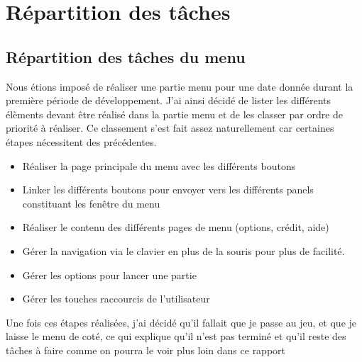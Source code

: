 \documentclass[12pt, openany]{report}
\begin{document}
  \chapter{Répartition des tâches}
    \section{Répartition des tâches du menu}
    Nous étions imposé de réaliser une partie menu pour une date donnée durant la première période de développement. J'ai ainsi décidé de lister les différents élèments devant être réalisé dans la partie menu et de les classer par ordre de priorité à réaliser. Ce classement s'est fait assez naturellement car certaines étapes nécessitent des précédentes.
    \begin{itemize}
      \item Réaliser la page principale du menu avec les différents boutons
      \item Linker les différents boutons pour envoyer vers les différents panels constituant les fenêtre du menu
      \item Réaliser le contenu des différents pages de menu (options, crédit, aide)
      \item Gérer la navigation via le clavier en plus de la souris pour plus de facilité.
      \item Gérer les options pour lancer une partie
      \item Gérer les touches raccourcis de l'utilisateur
    \end{itemize}

    Une fois ces étapes réalisées, j'ai décidé qu'il fallait que je passe au jeu, et que je laisse le menu de coté, ce qui explique qu'il n'est pas terminé et qu'il reste des tâches à faire comme on pourra le voir plus loin dans ce rapport
\end{document}
